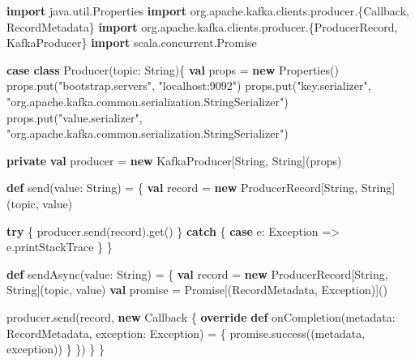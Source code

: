 \documentclass[]{article}
\newenvironment{Shaded}{}{}
\newcommand{\KeywordTok}[1]{\textcolor[rgb]{0.00,0.44,0.13}{\textbf{#1}}}
\newcommand{\StringTok}[1]{\textcolor[rgb]{0.25,0.44,0.63}{#1}}
\newcommand{\FunctionTok}[1]{\textcolor[rgb]{0.02,0.16,0.49}{#1}}
\newcommand{\NormalTok}[1]{#1}
\begin{document}
\begin{Shaded}
\begin{Highlighting}[]
\KeywordTok{import}\NormalTok{ java.}\FunctionTok{util}\NormalTok{.}\FunctionTok{Properties}
\KeywordTok{import}\NormalTok{ org.}\FunctionTok{apache}\NormalTok{.}\FunctionTok{kafka}\NormalTok{.}\FunctionTok{clients}\NormalTok{.}\FunctionTok{producer}\NormalTok{.\{Callback, RecordMetadata\}}
\KeywordTok{import}\NormalTok{ org.}\FunctionTok{apache}\NormalTok{.}\FunctionTok{kafka}\NormalTok{.}\FunctionTok{clients}\NormalTok{.}\FunctionTok{producer}\NormalTok{.\{ProducerRecord, KafkaProducer\}}
\KeywordTok{import}\NormalTok{ scala.}\FunctionTok{concurrent}\NormalTok{.}\FunctionTok{Promise}

\KeywordTok{case} \KeywordTok{class} \FunctionTok{Producer}\NormalTok{(topic: String)\{}
    \KeywordTok{val}\NormalTok{ props = }\KeywordTok{new}\NormalTok{ Properties()}
\NormalTok{    props.}\FunctionTok{put}\NormalTok{(}\StringTok{"bootstrap.servers"}\NormalTok{, }\StringTok{"localhost:9092"}\NormalTok{)}
\NormalTok{    props.}\FunctionTok{put}\NormalTok{(}\StringTok{"key.serializer"}\NormalTok{, }
        \StringTok{"org.apache.kafka.common.serialization.StringSerializer"}\NormalTok{)}
\NormalTok{    props.}\FunctionTok{put}\NormalTok{(}\StringTok{"value.serializer"}\NormalTok{, }
        \StringTok{"org.apache.kafka.common.serialization.StringSerializer"}\NormalTok{)}
    
    \KeywordTok{private} \KeywordTok{val}\NormalTok{ producer = }\KeywordTok{new}\NormalTok{ KafkaProducer[String, String](props)    }
    
    \KeywordTok{def} \FunctionTok{send}\NormalTok{(value: String) = \{}
      \KeywordTok{val}\NormalTok{ record = }\KeywordTok{new}\NormalTok{ ProducerRecord[String, String](topic, value)}

      \KeywordTok{try}\NormalTok{ \{}
\NormalTok{        producer.}\FunctionTok{send}\NormalTok{(record).}\FunctionTok{get}\NormalTok{()}
\NormalTok{      \} }\KeywordTok{catch}\NormalTok{ \{}
        \KeywordTok{case}\NormalTok{ e: Exception => e.}\FunctionTok{printStackTrace}
\NormalTok{      \}}
\NormalTok{    \}   }

    \KeywordTok{def} \FunctionTok{sendAsync}\NormalTok{(value: String) = \{}
        \KeywordTok{val}\NormalTok{ record = }\KeywordTok{new}\NormalTok{ ProducerRecord[String, String](topic, value)}
        \KeywordTok{val}\NormalTok{ promise = Promise[(RecordMetadata, Exception)]()}

\NormalTok{        producer.}\FunctionTok{send}\NormalTok{(record, }\KeywordTok{new}\NormalTok{ Callback \{}
            \KeywordTok{override} \KeywordTok{def} \FunctionTok{onCompletion}\NormalTok{(metadata: RecordMetadata, }
\NormalTok{                                      exception: Exception) = \{}
\NormalTok{                promise.}\FunctionTok{success}\NormalTok{((metadata, exception))}
\NormalTok{            \}}
\NormalTok{        \})}
\NormalTok{    \}}
\NormalTok{\}}
\end{Highlighting}
\end{Shaded}
\end{document}
